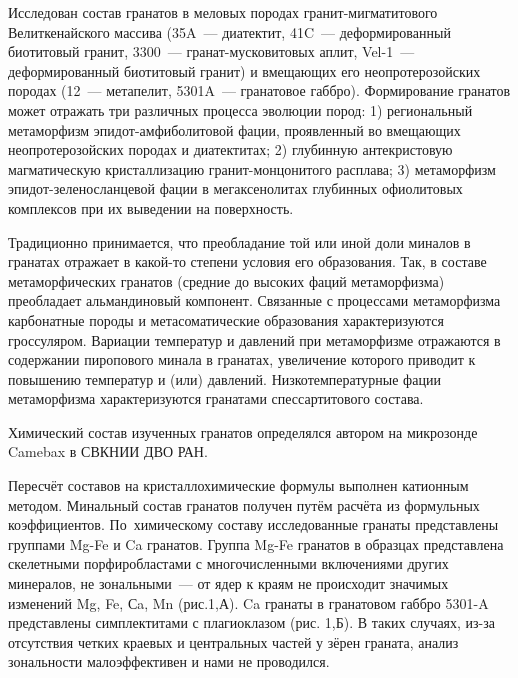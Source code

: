  

\makeProcTitle
{}

Исследован состав гранатов в меловых породах гранит-мигматитового Велиткенайского массива (35A~--- диатектит, 41C~--- деформированный биотитовый гранит, 3300~--- гранат-мусковитовых аплит, Vel-1~--- деформированный биотитовый гранит) и вмещающих его неопротерозойских породах (12~--- метапелит, 5301A~--- гранатовое габбро).  Формирование гранатов может отражать три различных процесса эволюции пород: 1) региональный метаморфизм эпидот-амфиболитовой фации, проявленный во вмещающих неопротерозойских породах и диатектитах; 2) глубинную антекристовую магматическую кристаллизацию гранит-монцонитого расплава; 3) метаморфизм эпидот-зеленосланцевой фации в мегаксенолитах глубинных офиолитовых комплексов при их выведении на поверхность.

Традиционно принимается, что преобладание той или иной доли миналов в гранатах отражает в какой-то степени  условия его образования.  Так, в составе метаморфических гранатов  (средние до высоких фаций метаморфизма) преобладает альмандиновый компонент. Связанные с процессами метаморфизма карбонатные породы и метасоматические образования характеризуются гроссуляром. Вариации температур и давлений при метаморфизме отражаются  в содержании пиропового минала в гранатах, увеличение которого приводит к повышению температур и (или) давлений. Низкотемпературные фации метаморфизма характеризуются гранатами спессартитового состава.

Химический состав изученных гранатов определялся автором на микрозонде Camebax в СВКНИИ ДВО РАН.

Пересчёт составов на кристаллохимические формулы выполнен катионным методом. Минальный состав гранатов получен путём расчёта из формульных коэффициентов. По~химическому составу исследованные гранаты представлены группами Mg-Fe и Ca гранатов. Группа Mg-Fe гранатов в образцах представлена  скелетными порфиробластами с многочисленными включениями других минералов, не  зональными~--- от ядер к краям не происходит значимых изменений Mg, Fe, Сa, Mn (рис.1,А). Ca гранаты в гранатовом габбро 5301-A представлены симплектитами с плагиоклазом (рис. 1,Б).  В таких случаях, из-за отсутствия четких  краевых и  центральных частей у зёрен граната, анализ зональности малоэффективен и нами не проводился.

